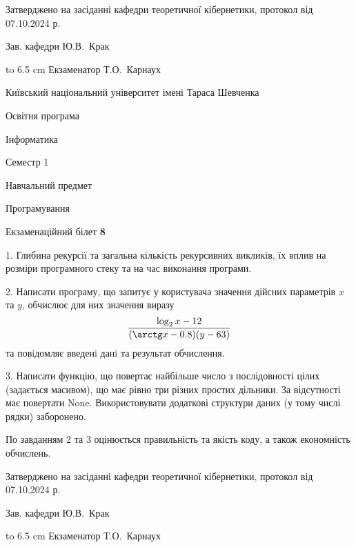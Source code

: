 \documentclass[12pt, ukrainian]{article}
\begin{document}
{\smallskip\smallskip \begin {scriptsize} Затверджено на засіданні кафедри теоретичної кібернетики, протокол   від   07.10.2024 р.\par\smallskip\smallskip\smallskip\smallskip
{\parbox {6.5 cm} {Зав. кафедри \dotfill Ю.В.~Крак}}\hspace {0.7cm} {\hbox to 6.5 cm { Екзаменатор \dotfill Т.О.~Карнаух}} \end{scriptsize}}
\vspace{0.9cm}
{{\begin {scriptsize}\par
{ \center  Київський національний університет імені Тараса Шевченка \par}
{\parbox {5 cm}{Освітня програма \hfill}{\parbox {7 cm}{Інформатика\hfill}}\parbox {6 cm}{\hfill Семестр 1}}\par
{\parbox {5 cm} {Навчальний предмет \hfill}\parbox {7 cm}{Програмування \hfill}\parbox {6cm}{\hfill}\par}\vspace{-15pt} \end{scriptsize}}{\center Екзаменаційний білет \No \textbf { 8 }\par}}
{%
1. Глибина рекурсії та загальна кількість рекурсивних викликів, їх вплив на розміри програмного стеку та на час виконання програми.%
\par
2. Написати програму, що запитує у користувача значення дійсних параметрів $x$ та $y$, обчислює для них значення виразу 
$$\frac{\log_{2} x - 12}{(\arctg x - 0.8) (y - 63)}$$ 
та повiдомляє введенi данi та результат обчислення.

\par
3. Написати функцію, що повертає найбільше число з послідовності цілих (задається масивом), що має рівно три різних простих дільники. За відсутності має повертати None. Використовувати додаткові структури даних (у тому числі рядки) заборонено.

По завданням 2 та 3 оцінюється правильність та якість коду, а також економність обчислень.

}
{\smallskip\smallskip \begin {scriptsize} Затверджено на засіданні кафедри теоретичної кібернетики, протокол   від   07.10.2024 р.\par\smallskip\smallskip\smallskip\smallskip
{\parbox {6.5 cm} {Зав. кафедри \dotfill Ю.В.~Крак}}\hspace {0.7cm} {\hbox to 6.5 cm { Екзаменатор \dotfill Т.О.~Карнаух}} \end{scriptsize}}
\end{document}
